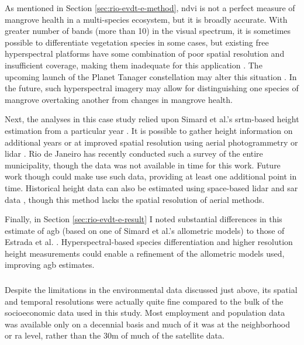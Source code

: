 As mentioned in Section \ref{sec:rio-evdt-e-method}, \ac{ndvi} is not a perfect measure of mangrove health in a multi-species ecosystem, but it is broadly accurate. With greater number of bands (more than 10) in the visual spectrum, it is sometimes possible to differentiate vegetation species in some cases, but existing free hyperspectral platforms have some combination of poor spatial resolution and insufficient coverage, making them inadequate for this application \cite{mousivandGlobalSensitivityAnalysis2014}. The upcoming launch of the Planet Tanager constellation may alter this situation \cite{planetlabspbcPlanetAnnouncesNew2022}. In the future, such hyperspectral imagery may allow for distinguishing one species of mangrove overtaking another from changes in mangrove health. 

Next, the analyses in this case study relied upon Simard et al.'s \ac{srtm}-based height estimation from a particular year \cite{simardMangroveCanopyHeight2019}. It is possible to gather height information on additional years or at improved spatial resolution using aerial photogrammetry or \ac{lidar} \cite{olagokeIndividualMangroveTree2015}. Rio de Janeiro has recently conducted such a survey of the entire municipality, though the data was not available in time for this work. Future work though could make use such data, providing at least one additional point in time. Historical height data can also be estimated using space-based \ac{lidar} and \ac{sar} data \cite{lagomasinoComparisonMangroveCanopy2016}, though this method lacks the spatial resolution of aerial methods.

Finally, in Section \ref{sec:rio-evdt-e-result} I noted substantial differences in this estimate of \ac{agb} (based on one of Simard et al.'s allometric models) to those of Estrada et al. \cite{estradaEconomicEvaluationCarbon2015}. Hyperspectral-based species differentiation and higher resolution height measurements could enable a refinement of the allometric models used, improving \ac{agb} estimates. 

\subsubsection{}

Despite the limitations in the environmental data discussed just above, its spatial and temporal resolutions were actually quite fine compared to the bulk of the socioeconomic data used in this study. Most employment and population data was available only on a decennial basis and much of it was at the neighborhood or \ac{ra} level, rather than the 30m of much of the satellite data. 

